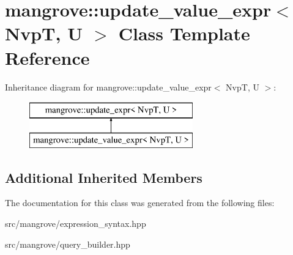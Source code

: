 \hypertarget{classmangrove_1_1update__value__expr}{}\section{mangrove\+:\+:update\+\_\+value\+\_\+expr$<$ NvpT, U $>$ Class Template Reference}
\label{classmangrove_1_1update__value__expr}
Inheritance diagram for mangrove\+:\+:update\+\_\+value\+\_\+expr$<$ NvpT, U $>$\+:\begin{figure}[H]
\begin{center}
\leavevmode
\includegraphics[height=2.000000cm]{classmangrove_1_1update__value__expr}
\end{center}
\end{figure}
\subsection*{Additional Inherited Members}


The documentation for this class was generated from the following files\+:\begin{DoxyCompactItemize}
\item 
src/mangrove/expression\+\_\+syntax.\+hpp\item 
src/mangrove/query\+\_\+builder.\+hpp\end{DoxyCompactItemize}

